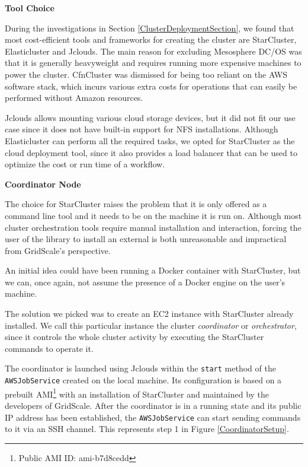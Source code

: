 \textbf{Tool Choice}

During the investigations in Section \ref{ClusterDeploymentSection}, we found that most cost-efficient tools and frameworks for creating the cluster are StarCluster, Elasticluster and Jclouds. The main reason for excluding Mesosphere DC/OS was that it is generally heavyweight and requires running more expensive machines to power the cluster. CfnCluster was dismissed for being too reliant on the AWS software stack, which incurs various extra costs for operations that can easily be performed without Amazon resources.

Jclouds allows mounting various cloud storage devices, but it did not fit our use case since it does not have built-in support for NFS installations. Although Elasticluster can perform all the required tasks, we opted for StarCluster as the cloud deployment tool, since it also provides a load balancer that can be used to optimize the cost or run time of a workflow.

\vspace{3mm}
\textbf{Coordinator Node}
\vspace{1mm}

The choice for StarCluster raises the problem that it is only offered as a command line tool and it needs to be on the machine it is run on. Although most cluster orchestration tools require manual installation and interaction, forcing the user of the library to install an external is both unreasonable and impractical from GridScale's perspective. 

An initial idea could have been running a Docker container with StarCluster, but we can, once again, not assume the presence of a Docker engine on the user's machine.

The solution we picked was to create an EC2 instance with StarCluster already installed. We call this particular instance the cluster \textit{coordinator} or \textit{orchestrator}, since it controls the whole cluster activity by executing the StarCluster commands to operate it. 

The coordinator is launched using Jclouds within the \verb|start| method of the \verb|AWSJobService| created on the local machine. Its configuration is based on a prebuilt AMI\footnote{Public AMI ID: ami-b7d8cedd} with an installation of StarCluster and maintained by the developers of GridScale. After the coordinator is in a running state and its public IP address has been established, the \verb|AWSJobService| can start sending commands to it via an SSH channel. This represents step 1 in Figure \ref{CoordinatorSetup}.

